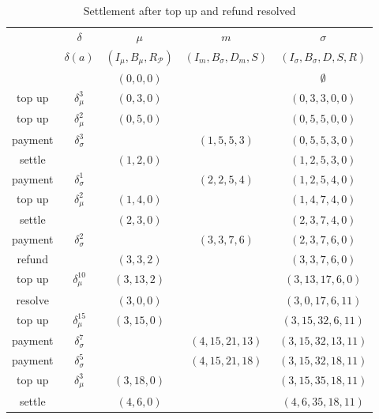 \documentclass{llncs}
\begin{document}
\begin{table}[t]
  \begin{tabularx}{\textwidth}{| S | S | C | C | C |}
       & $\delta$ & $\mu$ & $m$ & $\sigma$ \\ 
       & $\delta(a)$ & $(I_\mu,B_\mu,R_\mathcal{P})$ & $(I_m,B_\sigma,D_m,S)$ & $(I_\sigma,B_\sigma,D,S,R)$ \\
  \hhline{~====}
       & & $(0,0,0)$ & & $\emptyset$ \\ 
      top up  & $\delta_\mu^3$    & $(0,3,0)$  &                & $(0,3,3,0,0)$ \\
      top up  & $\delta_\mu^2$    & $(0,5,0)$  &                & $(0,5,5,0,0)$ \\
      payment & $\delta_\sigma^3$ &            & $(1,5,5,3)$    & $(0,5,5,3,0)$ \\
      settle  &                    & $(1,2,0)$  &                & $(1,2,5,3,0)$ \\
      payment & $\delta_\sigma^1$ &            & $(2,2,5,4)$    & $(1,2,5,4,0)$ \\
      top up  & $\delta_\mu^2$    & $(1,4,0)$  &                & $(1,4,7,4,0)$ \\
      settle  &                    & $(2,3,0)$  &                & $(2,3,7,4,0)$ \\
      payment & $\delta_\sigma^2$ &            & $(3,3,7,6)$    & $(2,3,7,6,0)$ \\
      refund  &                    & $(3,3,2)$  &                & $(3,3,7,6,0)$ \\
      top up  & $\delta_\mu^{10}$   & $(3,13,2)$ &                & $(3,13,17,6,0)$ \\
      resolve &                    & $(3,0,0)$  &                & $(3,0,17,6,11)$ \\
      top up  & $\delta_\mu^{15}$   & $(3,15,0)$ &                & $(3,15,32,6,11)$ \\
      payment & $\delta_\sigma^7$ &            & $(4,15,21,13)$ & $(3,15,32,13,11)$ \\
      payment & $\delta_\sigma^5$ &            & $(4,15,21,18)$ & $(3,15,32,18,11)$ \\
      top up  & $\delta_\mu^3$    & $(3,18,0)$ &                & $(3,15,35,18,11)$ \\
      settle  &                    & $(4,6,0)$  &                & $(4,6,35,18,11)$ \\
  \end{tabularx}
  \medskip
  \caption{Settlement after top up and refund resolved}
\end{table}
\end{document}
